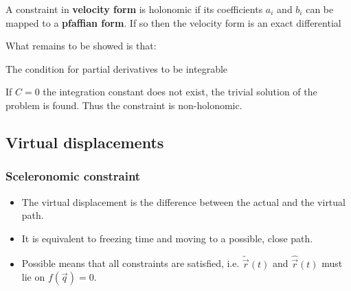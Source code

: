 \documentclass[10pt,a4paper]{scrartcl}
\begin{document}
\begin{multicols*}{2}
A constraint in \textbf{velocity form} is holonomic if its coefficients $a_i$ and $b_i$ can be mapped to a \textbf{pfaffian form}. If so then the velocity form is an exact differential


What remains to be showed is that:


The condition for partial derivatives to be integrable


If $C=0$ the integration constant does not exist, the trivial solution of the problem is found. Thus the constraint is non-holonomic.

\subsection{Virtual displacements}
\subsubsection{Sceleronomic constraint}
\begin{itemize}
\item The virtual displacement is the difference between the actual and the virtual path.
\item It is equivalent to freezing time and moving to a possible, close path.
\item Possible means that all constraints are satisfied, i.e. $\tilde{\vec{r}}(t)$ and $\hat{\vec{r}}(t)$  must lie on $f(\vec{q})=0$.


\end{itemize}
\end{multicols*}
\end{document}
